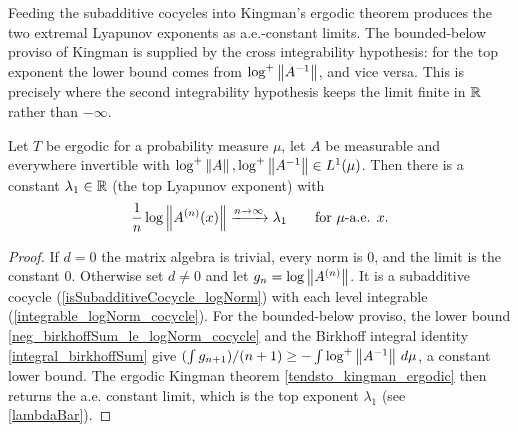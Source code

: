 Feeding the subadditive cocycles into Kingman's ergodic theorem produces the two extremal
Lyapunov exponents as a.e.-constant limits. The bounded-below proviso of Kingman is
supplied by the cross integrability hypothesis: for the top exponent the lower bound comes
from \(\log^{+}\left\lVert A^{-1} \right\rVert\), and vice versa. This is precisely where the second
integrability hypothesis keeps the limit finite in \(\mathbb{R}\) rather than \(-\infty\).

\begin{theorem}\label{furstenbergKesten_norm}
  \leanok
  Let \(T\) be ergodic for a probability measure \(\mu\), let \(A\) be measurable and
  everywhere invertible with \(\log^{+}\left\lVert A \right\rVert, \log^{+}\left\lVert A^{-1} \right\rVert \in L^{1}(\mu)\).
  Then there is a constant \(\lambda_1 \in \mathbb{R}\) (the top Lyapunov exponent) with
  \[
    \frac{1}{n}\log\left\lVert A^{(n)}(x) \right\rVert \xrightarrow{n\to\infty} \lambda_1
    \qquad \text{for } \mu\text{-a.e. } x.
  \]
\end{theorem}
\begin{proof}\leanok
  If \(d = 0\) the matrix algebra is trivial, every norm is \(0\), and the limit is the
  constant \(0\). Otherwise set \(d \neq 0\) and let \(g_n = \log\left\lVert A^{(n)} \right\rVert\). It is a
  subadditive cocycle (\ref{isSubadditiveCocycle_logNorm}) with each level integrable
  (\ref{integrable_logNorm_cocycle}). For the bounded-below proviso, the lower bound
  \ref{neg_birkhoffSum_le_logNorm_cocycle} and the Birkhoff integral identity
  \ref{integral_birkhoffSum} give \((\int g_{n+1})/(n+1) \ge -\int \log^{+}\left\lVert A^{-1} \right\rVert\,d\mu\),
  a constant lower bound. The ergodic Kingman theorem \ref{tendsto_kingman_ergodic} then
  returns the a.e. constant limit, which is the top exponent \(\lambda_1\) (see
  \ref{lambdaBar}).
\end{proof}

